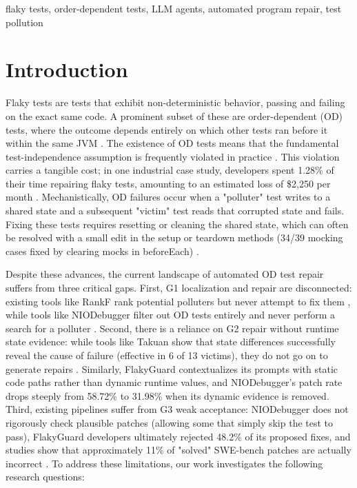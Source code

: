 \documentclass[conference]{IEEEtran}
\begin{document}
\begin{IEEEkeywords}
flaky tests, order-dependent tests, LLM agents, automated program repair, test pollution
\end{IEEEkeywords}

\section{Introduction}
\label{sec:intro}
Flaky tests are tests that exhibit non-deterministic behavior, passing and failing on the exact same code. A prominent subset of these are order-dependent (OD) tests, where the outcome depends entirely on which other tests ran before it within the same JVM \cite{luo2014empirical, parry2021survey}. The existence of OD tests means that the fundamental test-independence assumption is frequently violated in practice \cite{zhang2014independence}. This violation carries a tangible cost; in one industrial case study, developers spent 1.28\% of their time repairing flaky tests, amounting to an estimated loss of \$2,250 per month \cite{parry2025systemic}. Mechanistically, OD failures occur when a "polluter" test writes to a shared state and a subsequent "victim" test reads that corrupted state and fails. Fixing these tests requires resetting or cleaning the shared state, which can often be resolved with a small edit in the setup or teardown methods (34/39 mocking cases fixed by clearing mocks in beforeEach) \cite{shi2019ifixflakies, hashemi2025jsod}.

Despite these advances, the current landscape of automated OD test repair suffers from three critical gaps.
First, G1 localization and repair are disconnected: existing tools like RankF rank potential polluters but never attempt to fix them \cite{rahman2025rankf}, while tools like NIODebugger filter out OD tests entirely and never perform a search for a polluter \cite{ke2025niodebugger}.
Second, there is a reliance on G2 repair without runtime state evidence: while tools like Takuan show that state differences successfully reveal the cause of failure (effective in 6 of 13 victims), they do not go on to generate repairs \cite{levin2025takuan}. Similarly, FlakyGuard contextualizes its prompts with static code paths rather than dynamic runtime values, and NIODebugger's patch rate drops steeply from 58.72\% to 31.98\% when its dynamic evidence is removed.
Third, existing pipelines suffer from G3 weak acceptance: NIODebugger does not rigorously check plausible patches (allowing some that simply skip the test to pass), FlakyGuard developers ultimately rejected 48.2\% of its proposed fixes, and studies show that approximately 11\% of "solved" SWE-bench patches are actually incorrect \cite{wang2026swebench}.
To address these limitations, our work investigates the following research questions:
\end{document}
